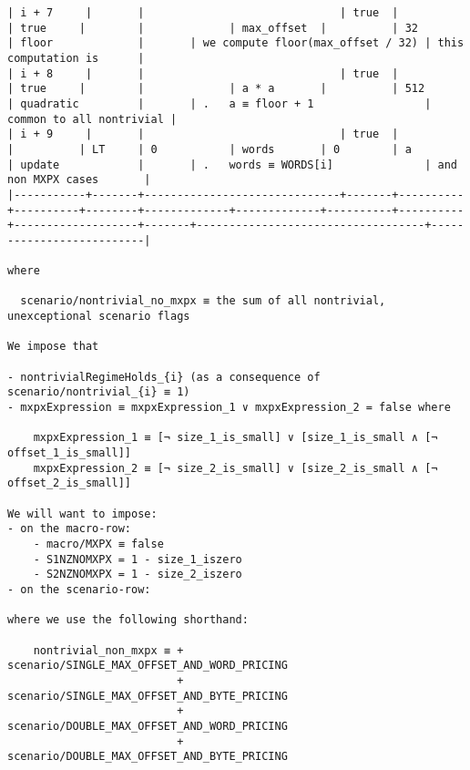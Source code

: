 \documentclass[varwidth=\maxdimen,margin=0.5cm,multi={verbatim}]{standalone}
\begin{document}
\begin{verbatim}
| i + 7     |       |                              | true  |          | true     |        |             | max_offset  |          | 32       | floor             |       | we compute floor(max_offset / 32) | this computation is      |
| i + 8     |       |                              | true  |          | true     |        |             | a * a       |          | 512      | quadratic         |       | .   a ≡ floor + 1                 | common to all nontrivial |
| i + 9     |       |                              | true  |          |          | LT     | 0           | words       | 0        | a        | update            |       | .   words ≡ WORDS[i]              | and non MXPX cases       |
|-----------+-------+------------------------------+-------+----------+----------+--------+-------------+-------------+----------+----------+-------------------+-------+-----------------------------------+--------------------------|

where 

  scenario/nontrivial_no_mxpx ≡ the sum of all nontrivial, unexceptional scenario flags

We impose that

- nontrivialRegimeHolds_{i} (as a consequence of scenario/nontrivial_{i} ≡ 1)
- mxpxExpression ≡ mxpxExpression_1 ∨ mxpxExpression_2 = false where

	mxpxExpression_1 ≡ [¬ size_1_is_small] ∨ [size_1_is_small ∧ [¬ offset_1_is_small]]
	mxpxExpression_2 ≡ [¬ size_2_is_small] ∨ [size_2_is_small ∧ [¬ offset_2_is_small]]

We will want to impose:
- on the macro-row:
	- macro/MXPX ≡ false
	- S1NZNOMXPX = 1 - size_1_iszero
	- S2NZNOMXPX = 1 - size_2_iszero
- on the scenario-row:

where we use the following shorthand:

    nontrivial_non_mxpx ≡ + scenario/SINGLE_MAX_OFFSET_AND_WORD_PRICING
                          + scenario/SINGLE_MAX_OFFSET_AND_BYTE_PRICING
                          + scenario/DOUBLE_MAX_OFFSET_AND_WORD_PRICING
                          + scenario/DOUBLE_MAX_OFFSET_AND_BYTE_PRICING

\end{verbatim}
\end{document}
